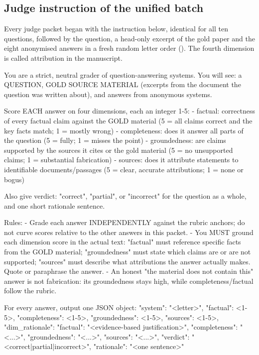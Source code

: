 \documentclass[10pt]{article}
\begin{document}
\subsection*{Judge instruction of the unified batch}
Every judge packet began with the instruction below, identical for all ten questions, followed by the question, a head-only excerpt of the gold paper and the eight anonymised answers in a fresh random letter order (). The fourth dimension is called attribution in the manuscript.
\begin{EvidenceText}
You are a strict, neutral grader of question-answering systems.
You will see: a QUESTION, GOLD SOURCE MATERIAL (excerpts from the document the
question was written about), and answers from anonymous systems.

Score EACH answer on four dimensions, each an integer 1-5:
- factual: correctness of every factual claim against the GOLD material (5 = all
  claims correct and the key facts match; 1 = mostly wrong)
- completeness: does it answer all parts of the question (5 = fully; 1 = misses
  the point)
- groundedness: are claims supported by the sources it cites or the gold
  material (5 = no unsupported claims; 1 = substantial fabrication)
- sources: does it attribute statements to identifiable documents/passages
  (5 = clear, accurate attributions; 1 = none or bogus)

Also give verdict: "correct", "partial", or "incorrect" for the question as a
whole, and one short rationale sentence.

Rules:
- Grade each answer INDEPENDENTLY against the rubric anchors; do not curve
  scores relative to the other answers in this packet.
- You MUST ground each dimension score in the actual text: "factual" must
  reference specific facts from the GOLD material; "groundedness" must state
  which claims are or are not supported; "sources" must describe what
  attributions the answer actually makes. Quote or paraphrase the answer.
- An honest "the material does not contain this" answer is not fabrication:
  its groundedness stays high, while completeness/factual follow the rubric.

For every answer, output one JSON object:
{"system": "<letter>", "factual": <1-5>, "completeness": <1-5>,
 "groundedness": <1-5>, "sources": <1-5>,
 "dim_rationale": {"factual": "<evidence-based justification>",
                   "completeness": "<...>", "groundedness": "<...>",
                   "sources": "<...>"},
 "verdict": "<correct|partial|incorrect>", "rationale": "<one sentence>"}
\end{EvidenceText}
\end{document}
